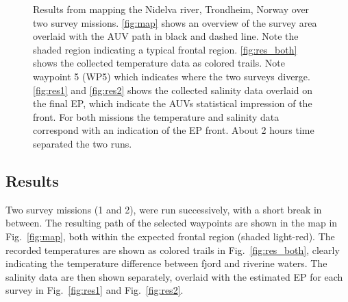 \documentclass[aoas]{imsart}
\begin{document}
\begin{figure}[!h]
\hspace{0.2cm}
\caption{Results from mapping the Nidelva river, Trondheim, Norway
  over two survey missions. \ref{fig:map} shows an overview of the
  survey area overlaid with the AUV path in black and dashed
  line. Note the shaded region indicating a typical frontal
  region. \ref{fig:res_both} shows the collected temperature data as
  colored trails. Note waypoint 5 (WP5) which indicates where the two
  surveys diverge. \ref{fig:res1} and \ref{fig:res2} shows the
  collected salinity data overlaid on the final EP, which indicate the
  AUVs statistical impression of the front. For both missions the
  temperature and salinity data correspond with an indication of the
  EP front. About 2 hours time separated the two runs.}
\label{fig:results}
\end{figure}

\subsection{Results}

Two survey missions (1 and 2), were run successively, with a short
break in between. The resulting path of the selected waypoints are
shown in the map in Fig.~\ref{fig:map}, both within the expected
frontal region (shaded light-red). The recorded temperatures are shown as
colored trails in Fig.~\ref{fig:res_both}, clearly indicating the
temperature difference between fjord and riverine waters. The salinity
data are then shown separately, overlaid with the estimated EP for
each survey in Fig.~\ref{fig:res1} and Fig.~\ref{fig:res2}.
\end{document}
